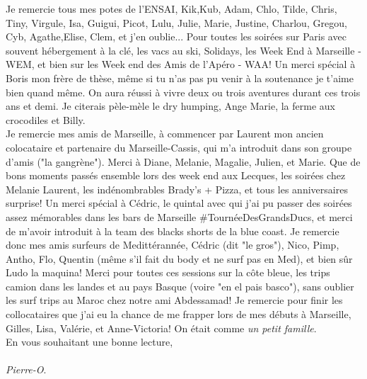 Je remercie tous mes potes de l'ENSAI, Kik,Kub, Adam, Chlo, Tilde, Chris, Tiny, Virgule, Isa, Guigui, Picot, Lulu, Julie, Marie, Justine, Charlou, Gregou, Cyb, Agathe,Elise, Clem, et j'en oublie... Pour toutes les soirées sur Paris avec souvent hébergement à la clé, les vacs au ski, Solidays, les Week End à Marseille - WEM, et bien sur les Week end des Amis de l'Apéro - WAA! Un merci spécial à Boris mon frère de thèse, même si tu n'as pas pu venir à la soutenance je t'aime bien quand même. On aura réussi à vivre deux ou trois aventures durant ces trois ans et demi. Je citerais pèle-mèle le dry humping, Ange Marie, la ferme aux crocodiles et Billy.\\

Je remercie mes amis de Marseille, à commencer par Laurent mon ancien colocataire et partenaire du Marseille-Cassis, qui m'a introduit dans son groupe d'amis ("la gangrène"). Merci à Diane, Melanie, Magalie, Julien, et Marie. Que de bons moments passés ensemble lors des week end aux Lecques, les soirées chez Melanie Laurent, les indénombrables Brady's + Pizza, et tous les anniversaires surprise! Un merci spécial à Cédric, le quintal avec qui j'ai pu passer des soirées assez mémorables dans les bars de Marseille $\#$TournéeDesGrandsDucs, et merci de m'avoir introduit à la team des blacks shorts de la blue coast. Je remercie donc mes amis surfeurs de Medittérannée, Cédric (dit "le gros"), Nico, Pimp, Antho, Flo, Quentin (même s'il fait du body et ne surf pas en Med), et bien sûr Ludo la maquina! Merci pour toutes ces sessions sur la côte bleue, les trips camion dans les landes et au pays Basque (voire "en el pais basco"), sans oublier les surf trips au Maroc chez notre ami Abdessamad! Je remercie pour finir les collocataires que j'ai eu la chance de me frapper lors de mes débuts à Marseille, Gilles, Lisa, Valérie, et Anne-Victoria!
On était comme \textit{un petit famille}.\\

%
En vous souhaitant une bonne lecture,\\
\\
\textit{Pierre-O}.   
   